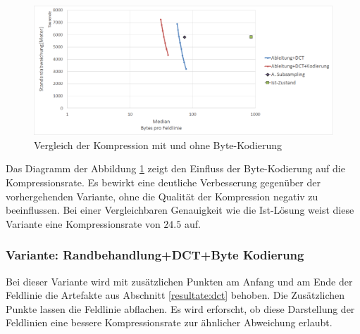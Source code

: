 \begin{figure}[!htbp]
	\center
	\includegraphics[width=1\textwidth,keepaspectratio]{./pictures/resultate/loesung1/loesung1-6/loesung1_6.png}
	\caption{Vergleich der Kompression mit und ohne Byte-Kodierung}
	\label{resultate:loesung1:dct:kodierung}
\end{figure}
Das Diagramm der Abbildung \ref{resultate:loesung1:dct:kodierung} zeigt den Einfluss der Byte-Kodierung auf die Kompressionsrate. Es bewirkt eine deutliche Verbesserung gegenüber der vorhergehenden Variante, ohne die Qualität der Kompression negativ zu beeinflussen. Bei einer Vergleichbaren Genauigkeit wie die Ist-Lösung weist diese Variante eine Kompressionsrate von $24.5$ auf.

\subsubsection{Variante: Randbehandlung+DCT+Byte Kodierung} \label{resultate:loesung1:dct:randbeh+byte}
Bei dieser Variante wird mit zusätzlichen Punkten am Anfang und am Ende der Feldlinie die Artefakte aus Abschnitt \ref{resultate:dct} behoben. Die Zusätzlichen Punkte lassen die Feldlinie abflachen. Es wird erforscht, ob diese Darstellung der Feldlinien eine bessere Kompressionsrate zur ähnlicher Abweichung erlaubt. 

